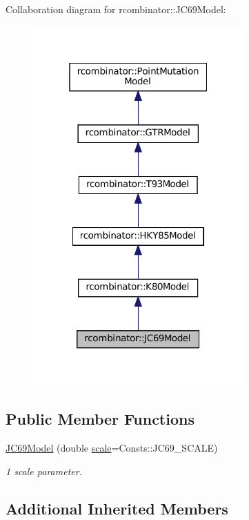 Collaboration diagram for rcombinator\+:\+:J\+C69\+Model\+:\nopagebreak
\begin{figure}[H]
\begin{center}
\leavevmode
\includegraphics[width=229pt]{classrcombinator_1_1JC69Model__coll__graph}
\end{center}
\end{figure}
\subsection*{Public Member Functions}
\begin{DoxyCompactItemize}
\item 
\mbox{\hyperlink{classrcombinator_1_1JC69Model_ab28021c22ed997738e2eac2f280930a5}{J\+C69\+Model}} (double \mbox{\hyperlink{classrcombinator_1_1PointMutationModel_a328a30a438bb1b6a625faa3f714a85c8}{scale}}=Consts\+::\+J\+C69\+\_\+\+S\+C\+A\+LE)
\begin{DoxyCompactList}\small\item\em 1 scale parameter. \end{DoxyCompactList}\end{DoxyCompactItemize}
\subsection*{Additional Inherited Members}


